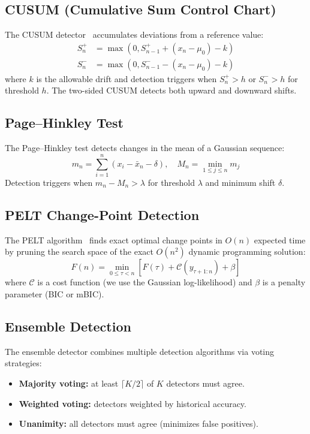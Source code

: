 \documentclass[11pt,a4paper]{article}
\begin{document}
\subsection{CUSUM (Cumulative Sum Control Chart)}

The CUSUM detector~\citep{page1954} accumulates deviations from a reference value:
\begin{align}
    S_n^+ &= \max(0, S_{n-1}^+ + (x_n - \mu_0) - k) \\
    S_n^- &= \max(0, S_{n-1}^- - (x_n - \mu_0) - k)
\end{align}
where $k$ is the allowable drift and detection triggers when $S_n^+ > h$ or $S_n^- > h$ for threshold $h$. The two-sided CUSUM detects both upward and downward shifts.

\subsection{Page--Hinkley Test}

The Page--Hinkley test detects changes in the mean of a Gaussian sequence:
\begin{equation}
    m_n = \sum_{i=1}^{n} (x_i - \bar{x}_n - \delta), \quad M_n = \min_{1 \leq j \leq n} m_j
\end{equation}
Detection triggers when $m_n - M_n > \lambda$ for threshold $\lambda$ and minimum shift $\delta$.

\subsection{PELT Change-Point Detection}

The PELT algorithm~\citep{killick2012} finds exact optimal change points in $O(n)$ expected time by pruning the search space of the exact $O(n^2)$ dynamic programming solution:
\begin{equation}
    F(n) = \min_{0 \leq \tau < n} \left[ F(\tau) + \mathcal{C}(y_{\tau+1:n}) + \beta \right]
\end{equation}
where $\mathcal{C}$ is a cost function (we use the Gaussian log-likelihood) and $\beta$ is a penalty parameter (BIC or mBIC).

\subsection{Ensemble Detection}

The ensemble detector combines multiple detection algorithms via voting strategies:
\begin{itemize}
    \item \textbf{Majority voting:} at least $\lceil K/2 \rceil$ of $K$ detectors must agree.
    \item \textbf{Weighted voting:} detectors weighted by historical accuracy.
    \item \textbf{Unanimity:} all detectors must agree (minimizes false positives).
\end{itemize}
\end{document}
